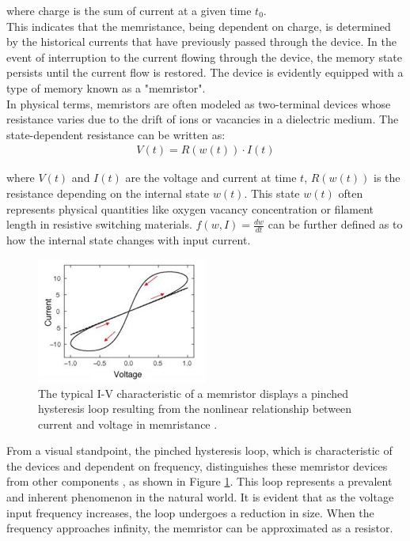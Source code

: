 \noindent where charge is the sum of current at a given time $t_0$.  \\

\noindent This indicates that the memristance, being dependent on charge, is determined by the historical currents that have previously passed through the device. In the event of interruption to the current flowing through the device, the memory state persists until the current flow is restored. The device is evidently equipped with a type of memory known as a "memristor".\\

\noindent In physical terms, memristors are often modeled as two-terminal devices whose resistance varies due to the drift of ions or vacancies in a dielectric medium. The state-dependent resistance can be written as:
\begin{align}
    V(t) = R(w(t)) \cdot I(t) \label{eq:2.24}
\end{align}

\noindent where $V(t)$ and $I(t)$ are the voltage and current at time $t$, $R(w(t))$ is the resistance depending on the internal state $w(t)$. This state $w(t)$ often represents physical quantities like oxygen vacancy concentration or filament length in resistive switching materials. $f(w, I) = \frac{dw}{dt}$ can be further defined as to how the internal state changes with input current. \\

\begin{figure}[htbp!] 
    \centering    
    \includegraphics[width=0.5\textwidth]{Chapter2/Figs/f.png}
    \caption[Typical I-V characteristic of a memristor]{The typical I-V characteristic  of a memristor displays a pinched hysteresis loop resulting from the nonlinear relationship between current and voltage in memristance \cite{wen2012dynamics}.}
    \label{fig:2f}
\end{figure}
    
\noindent From a visual standpoint, the pinched hysteresis loop, which is characteristic of the devices and dependent on frequency, distinguishes these memristor devices from other components \cite{chua2019resistance}, as shown in Figure \ref{fig:2f}. This loop represents a prevalent and inherent phenomenon in the natural world. It is evident that as the voltage input frequency increases, the loop undergoes a reduction in size. When the frequency approaches infinity, the memristor can be approximated as a resistor.\\

